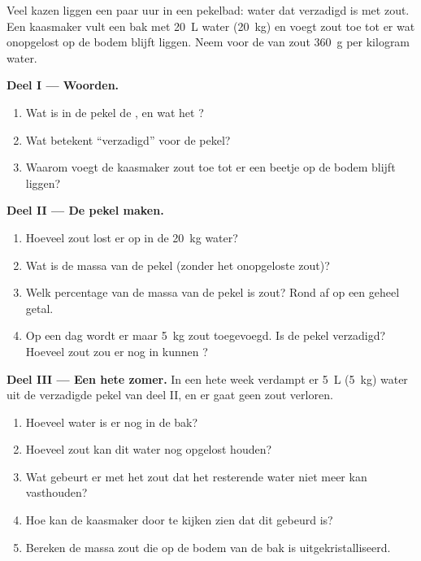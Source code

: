 \begin{problem}
\label{pb:g6:solutions-and-solubility:1}
Veel kazen liggen een paar uur in een pekelbad: water dat verzadigd is
met zout. Een kaasmaker vult een bak met \qty{20}{L} water
(\qty{20}{kg}) en voegt zout toe tot er wat onopgelost op de bodem
blijft liggen. Neem voor de  van zout \qty{360}{g} per
kilogram water.

\medskip
\noindent\textbf{Deel I --- Woorden.}
\begin{enumerate}
  \item Wat is in de pekel de , en wat het ?
  \item Wat betekent ``verzadigd'' voor de pekel?
  \item Waarom voegt de kaasmaker zout toe tot er een beetje op de bodem
        blijft liggen?
\end{enumerate}

\medskip
\noindent\textbf{Deel II --- De pekel maken.}
\begin{enumerate}[resume]
  \item Hoeveel zout lost er op in de \qty{20}{kg} water?
  \item Wat is de massa van de pekel (zonder het onopgeloste zout)?
  \item Welk percentage van de massa van de pekel is zout? Rond af op
        een geheel getal.
  \item Op een dag wordt er maar \qty{5}{kg} zout toegevoegd. Is de
        pekel verzadigd? Hoeveel zout zou er nog in kunnen ?
\end{enumerate}

\medskip
\noindent\textbf{Deel III --- Een hete zomer.}
In een hete week verdampt er \qty{5}{L} (\qty{5}{kg}) water uit de
verzadigde pekel van deel II, en er gaat geen zout verloren.
\begin{enumerate}[resume]
  \item Hoeveel water is er nog in de bak?
  \item Hoeveel zout kan dit water nog opgelost houden?
  \item Wat gebeurt er met het zout dat het resterende water niet meer
        kan vasthouden?
  \item Hoe kan de kaasmaker door te kijken zien dat dit gebeurd is?
  \item Bereken de massa zout die op de bodem van de bak is
        uitgekristalliseerd.
\end{enumerate}
\end{problem}
